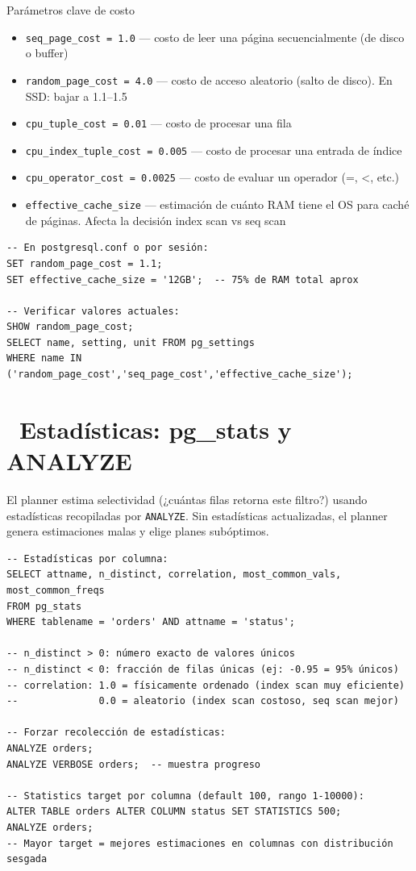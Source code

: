 \begin{teoriabox}{Parámetros clave de costo}
\begin{itemize}
  \item \texttt{seq\_page\_cost = 1.0} — costo de leer una página secuencialmente (de disco o buffer)
  \item \texttt{random\_page\_cost = 4.0} — costo de acceso aleatorio (salto de disco). En SSD: bajar a 1.1--1.5
  \item \texttt{cpu\_tuple\_cost = 0.01} — costo de procesar una fila
  \item \texttt{cpu\_index\_tuple\_cost = 0.005} — costo de procesar una entrada de índice
  \item \texttt{cpu\_operator\_cost = 0.0025} — costo de evaluar un operador (=, <, etc.)
  \item \texttt{effective\_cache\_size} — estimación de cuánto RAM tiene el OS para caché de páginas. Afecta la decisión index scan vs seq scan
\end{itemize}
\end{teoriabox}

\begin{lstlisting}[caption={Ajustar costos para SSD}]
-- En postgresql.conf o por sesión:
SET random_page_cost = 1.1;
SET effective_cache_size = '12GB';  -- 75% de RAM total aprox

-- Verificar valores actuales:
SHOW random_page_cost;
SELECT name, setting, unit FROM pg_settings
WHERE name IN ('random_page_cost','seq_page_cost','effective_cache_size');
\end{lstlisting}

\section[Estadísticas: pg\_stats y ANALYZE]{~Estadísticas: pg\_stats y ANALYZE}

El planner estima selectividad (¿cuántas filas retorna este filtro?) usando estadísticas recopiladas por \texttt{ANALYZE}.
Sin estadísticas actualizadas, el planner genera estimaciones malas y elige planes subóptimos.

\begin{lstlisting}[caption={Explorar estadísticas del planner}]
-- Estadísticas por columna:
SELECT attname, n_distinct, correlation, most_common_vals, most_common_freqs
FROM pg_stats
WHERE tablename = 'orders' AND attname = 'status';

-- n_distinct > 0: número exacto de valores únicos
-- n_distinct < 0: fracción de filas únicas (ej: -0.95 = 95% únicos)
-- correlation: 1.0 = físicamente ordenado (index scan muy eficiente)
--              0.0 = aleatorio (index scan costoso, seq scan mejor)

-- Forzar recolección de estadísticas:
ANALYZE orders;
ANALYZE VERBOSE orders;  -- muestra progreso

-- Statistics target por columna (default 100, rango 1-10000):
ALTER TABLE orders ALTER COLUMN status SET STATISTICS 500;
ANALYZE orders;
-- Mayor target = mejores estimaciones en columnas con distribución sesgada
\end{lstlisting}

